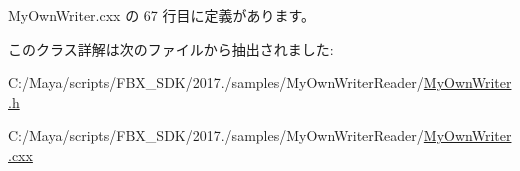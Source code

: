  My\+Own\+Writer.\+cxx の 67 行目に定義があります。



このクラス詳解は次のファイルから抽出されました\+:\begin{DoxyCompactItemize}
\item 
C\+:/\+Maya/scripts/\+F\+B\+X\+\_\+\+S\+D\+K/2017./samples/\+My\+Own\+Writer\+Reader/\hyperlink{_my_own_writer_8h}{My\+Own\+Writer.\+h}\item 
C\+:/\+Maya/scripts/\+F\+B\+X\+\_\+\+S\+D\+K/2017./samples/\+My\+Own\+Writer\+Reader/\hyperlink{_my_own_writer_8cxx}{My\+Own\+Writer.\+cxx}\end{DoxyCompactItemize}
